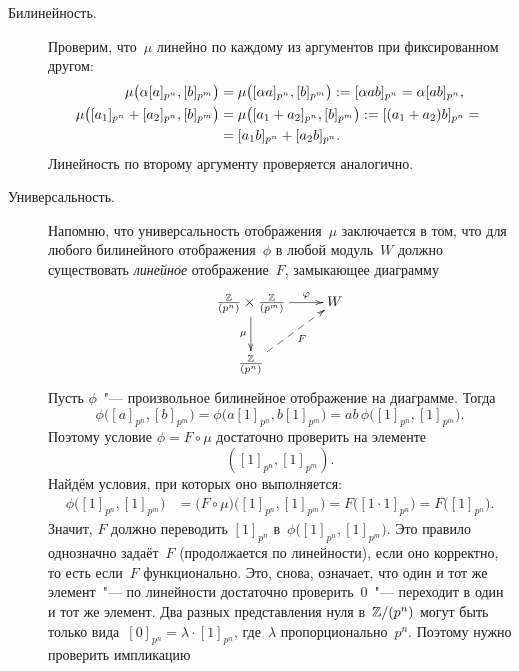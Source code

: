 \begin{proofm}
\begin{description}
		\item[Билинейность.] Проверим, что~$\mu$ линейно по каждому из аргументов при фиксированном другом:
			\begin{align*}
				\mu
				\bigl(
					\alpha [a]_{p^n}
					,
					[b]_{p^m}
				\bigr)
				&=
				\mu
				\bigl(
					[\alpha a]_{p^n}
					,
					[b]_{p^m}
				\bigr)
				:=
				[\alpha ab]_{p^n}
				=
				\alpha [ab]_{p^n},
				\\
				\mu
				\bigl(
					[a_1]_{p^n} + [a_2]_{p^n}
					,
					[b]_{p^m}
				\bigr)
				&=
				\mu
				\bigl(
					[a_1 + a_2]_{p^n}
					,
					[b]_{p^m}
				\bigr)
				:=
				[(a_1 + a_2)b]_{p^n}
				= {} \\ {} &=
				[a_1b]_{p^n} +
				[a_2b]_{p^n}.
			\end{align*}
			Линейность по второму аргументу проверяется аналогично.
		\item[Универсальность.] Напомню, что универсальность отображения~$\mu$ заключается в том, что для любого билинейного отображения~$\phi$ в любой модуль~$W$ должно существовать \emph{линейное} отображение~$F$, замыкающее диаграмму
			\[
				\xymatrix{%
					\frac{\ZZ}{(p^n)}
					\times
					\frac{\ZZ}{(p^m)}
					\ar [r] ^-{\phi}
					\ar [d] _-{\mu}
					&
					W
					\\
					\frac{\ZZ}{(p^n)}
					\ar @{-->} [ur] _-{F}
				}
			\]
			Пусть $\phi$~"--- произвольное билинейное отображение на диаграмме. Тогда
			\[
				\phi
				\bigl(
					[a]_{p^n},
					[b]_{p^m}
				\bigr)
				=
				\phi
				\bigl(
					a[1]_{p^n},
					b[1]_{p^m}
				\bigr)
				=
				ab\,
				\phi
				\bigl(
					[1]_{p^n},
					[1]_{p^m}
				\bigr)
				.
			\]
			Поэтому условие $\phi = F \circ \mu$ достаточно проверить на элементе
			\[
				([1]_{p^n}, [1]_{p^m})
				.
			\]
			Найдём условия, при которых оно выполняется:
			\begin{align*}
				\phi
				\bigl(
					[1]_{p^n},
					[1]_{p^m}
				\bigr)
				&=
				\bigl(
					F \circ \mu
				\bigr)
				\bigl(
					[1]_{p^n},
					[1]_{p^m}
				\bigr)
				=
				F
				\bigl(
					[1 \cdot 1]_{p^n}
				\bigr)
				=
				F
				\bigl(
					[1]_{p^n}
				\bigr)
				.
			\end{align*}
			Значит, $F$ должно переводить $[1]_{p^n}$
			в~$
				\phi
				\bigl(
					[1]_{p^n},
					[1]_{p^m}
				\bigr)
			$.
			Это правило однозначно задаёт~$F$ (продолжается по линейности), если оно корректно, то есть если~$F$ функционально. Это, снова, означает, что один и тот же элемент~"--- по линейности достаточно проверить~$0$~"--- переходит в один и тот же элемент. Два разных представления нуля в~$\mathbb{Z}/(p^n)$ могут быть только вида~$[0]_{p^n} = \lambda \cdot [1]_{p^n}$, где~$\lambda$ пропорционально~$p^n$. Поэтому нужно проверить импликацию

\end{description}
\end{proofm}
